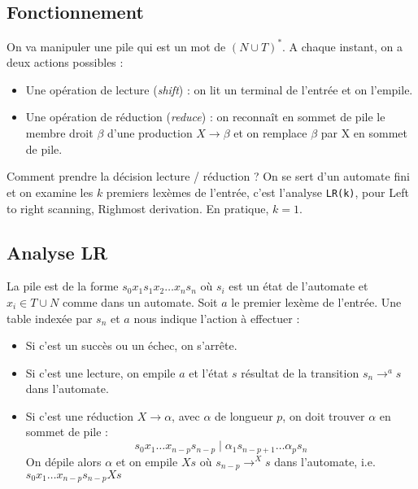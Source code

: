 \documentclass{cours}
\begin{document}
\subsection{Fonctionnement}
On va manipuler une pile qui est un mot de $(N \cup T)^{*}$. 
A chaque instant, on a deux actions possibles : 
\begin{itemize}
    \item Une opération de lecture (\textit{shift}) : on lit un terminal de l'entrée et on l'empile.
    \item Une opération de réduction (\textit{reduce}) : on reconnaît en sommet de pile le membre droit $\beta$ d'une production $X \rightarrow \beta$ et on remplace $\beta$ par X en sommet de pile.
\end{itemize}
Comment prendre la décision lecture / réduction ? On se sert d'un automate fini et on examine les $k$ premiers lexèmes de l'entrée, c'est l'analyse \texttt{LR(k)}, pour \og Left to right scanning, Righmost derivation\fg. En pratique, $k = 1$.
\subsection{Analyse LR}
La pile est de la forme $s_{0}x_{1}s_{1}x_{2}\ldots x_{n}s_{n}$ où $s_{i}$ est un état de l'automate et $x_{i} \in T \cup N$ comme dans un automate. 
Soit $a$ le premier lexème de l'entrée. Une table indexée par $s_{n}$ et $a$ nous indique l'action à effectuer : 
\begin{itemize}
    \item Si c'est un succès ou un échec, on s'arrête.
    \item Si c'est une lecture, on empile $a$ et l'état $s$ résultat de la transition $s_{n} \rightarrow^{a} s$ dans l'automate.
    \item Si c'est une réduction $X \rightarrow \alpha$, avec $\alpha$ de longueur $p$, on doit trouver $\alpha$ en sommet de pile : 
    \[
        s_{0}x_{1}\ldots x_{n-p}s_{n-p}\mid \alpha_{1}s_{n-p+1}\ldots \alpha_{p}s_{n}
    \]
    On dépile alors $\alpha$ et on empile $X s$ où $s_{n-p} \rightarrow^{X} s$ dans l'automate, i.e. $s_{0}x_{1}\ldots x_{n-p}s_{n-p}Xs$
\end{itemize}
\end{document}
